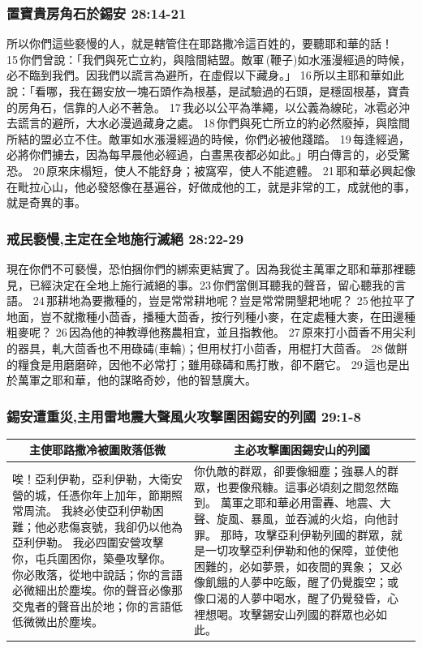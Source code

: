 \subsubsection{置寶貴房角石於錫安 28:14-21}
所以你們這些褻慢的人，就是轄管住在耶路撒冷這百姓的，要聽耶和華的話！ 15 你們曾說：「我們與死亡立約，與陰間結盟。敵軍 (鞭子)如水漲漫經過的時候，必不臨到我們。因我們以謊言為避所，在虛假以下藏身。」 16 所以主耶和華如此說：「看哪，我在錫安放一塊石頭作為根基，是試驗過的石頭，是穩固根基，寶貴的房角石，信靠的人必不著急。 17 我必以公平為準繩，以公義為線砣，冰雹必沖去謊言的避所，大水必漫過藏身之處。 18 你們與死亡所立的約必然廢掉，與陰間所結的盟必立不住。敵軍如水漲漫經過的時候，你們必被他踐踏。 19 每逢經過，必將你們擄去，因為每早晨他必經過，白晝黑夜都必如此。」明白傳言的，必受驚恐。 20 原來床榻短，使人不能舒身；被窩窄，使人不能遮體。 21 耶和華必興起像在毗拉心山，他必發怒像在基遍谷，好做成他的工，就是非常的工，成就他的事，就是奇異的事。

\subsubsection{戒民褻慢,主定在全地施行滅絕 28:22-29}
現在你們不可褻慢，恐怕捆你們的綁索更結實了。因為我從主萬軍之耶和華那裡聽見，已經決定在全地上施行滅絕的事。23 你們當側耳聽我的聲音，留心聽我的言語。 24 那耕地為要撒種的，豈是常常耕地呢？豈是常常開墾耙地呢？ 25 他拉平了地面，豈不就撒種小茴香，播種大茴香，按行列種小麥，在定處種大麥，在田邊種粗麥呢？ 26 因為他的神教導他務農相宜，並且指教他。 27 原來打小茴香不用尖利的器具，軋大茴香也不用碌碡(車輪)；但用杖打小茴香，用棍打大茴香。 28 做餅的糧食是用磨磨碎，因他不必常打；雖用碌碡和馬打散，卻不磨它。 29 這也是出於萬軍之耶和華，他的謀略奇妙，他的智慧廣大。

\subsubsection{錫安遭重災,主用雷地震大聲風火攻擊圍困錫安的列國 29:1-8}
\begin{table}[H]
\centering
\begin{tabular}{p{7.75cm}|p{9.50cm}}\hline\hline
\multicolumn{1}{c|}{主使耶路撒冷被圍敗落低微}&\multicolumn{1}{c}{主必攻擊圍困錫安山的列國}\\\hline
唉！亞利伊勒，亞利伊勒，大衛安營的城，任憑你年上加年，節期照常周流。
我終必使亞利伊勒困難；他必悲傷哀號，我卻仍以他為亞利伊勒。
我必四圍安營攻擊你，屯兵圍困你，築壘攻擊你。
你必敗落，從地中說話；你的言語必微細出於塵埃。你的聲音必像那交鬼者的聲音出於地；你的言語低低微微出於塵埃。
&你仇敵的群眾，卻要像細塵；強暴人的群眾，也要像飛糠。這事必頃刻之間忽然臨到。
萬軍之耶和華必用雷轟、地震、大聲、旋風、暴風，並吞滅的火焰，向他討罪。
那時，攻擊亞利伊勒列國的群眾，就是一切攻擊亞利伊勒和他的保障，並使他困難的，必如夢景，如夜間的異象；
又必像飢餓的人夢中吃飯，醒了仍覺腹空；或像口渴的人夢中喝水，醒了仍覺發昏，心裡想喝。攻擊錫安山列國的群眾也必如此。\\\hline
\end{tabular}
\end{table}

